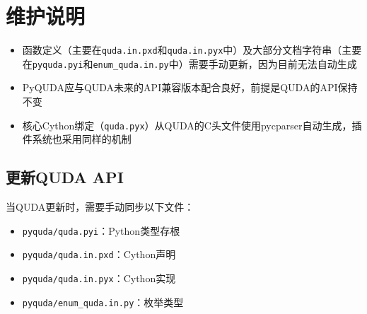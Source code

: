 \documentclass[12pt,a4paper]{ctexart}
\begin{document}
\section{维护说明}

\begin{itemize}[leftmargin=*]
    \item 函数定义（主要在\texttt{quda.in.pxd}和\texttt{quda.in.pyx}中）及大部分文档字符串（主要在\texttt{pyquda.pyi}和\texttt{enum\_quda.in.py}中）需要手动更新，因为目前无法自动生成
    \item PyQUDA应与QUDA未来的API兼容版本配合良好，前提是QUDA的API保持不变
    \item 核心Cython绑定（\texttt{quda.pyx}）从QUDA的C头文件使用pycparser自动生成，插件系统也采用同样的机制
\end{itemize}

\subsection{更新QUDA API}

当QUDA更新时，需要手动同步以下文件：
\begin{itemize}[leftmargin=*]
    \item \texttt{pyquda/quda.pyi}：Python类型存根
    \item \texttt{pyquda/quda.in.pxd}：Cython声明
    \item \texttt{pyquda/quda.in.pyx}：Cython实现
    \item \texttt{pyquda/enum\_quda.in.py}：枚举类型
\end{itemize}
\end{document}
